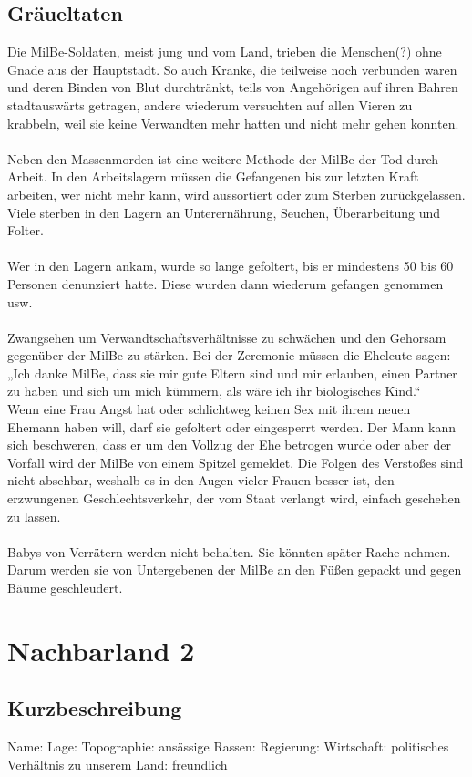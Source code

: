 \subsection{Gräueltaten}
Die MilBe-Soldaten, meist jung und vom Land, trieben die Menschen(?) ohne Gnade aus der Hauptstadt.
So auch Kranke, die teilweise noch verbunden waren und deren Binden von Blut durchtränkt, teils von Angehörigen auf ihren Bahren stadtauswärts getragen, andere wiederum versuchten auf allen Vieren zu krabbeln, weil sie keine Verwandten mehr hatten und nicht mehr gehen konnten.\\
\\
Neben den Massenmorden ist eine weitere Methode der MilBe der Tod durch Arbeit.
In den Arbeitslagern müssen die Gefangenen bis zur letzten Kraft arbeiten, wer nicht mehr kann, wird aussortiert oder zum Sterben zurückgelassen.
Viele sterben in den Lagern an Unterernährung, Seuchen, Überarbeitung und Folter.\\
\\
Wer in den Lagern ankam, wurde so lange gefoltert, bis er mindestens 50 bis 60 Personen denunziert hatte.
Diese wurden dann wiederum gefangen genommen usw.\\
\\
Zwangsehen um Verwandtschaftsverhältnisse zu schwächen und den Gehorsam gegenüber der MilBe zu stärken.
Bei der Zeremonie müssen die Eheleute sagen: „Ich danke MilBe, dass sie mir gute Eltern sind und mir erlauben, einen Partner zu haben und sich um mich kümmern, als wäre ich ihr biologisches Kind.“\\
Wenn eine Frau Angst hat oder schlichtweg keinen Sex mit ihrem neuen Ehemann haben will, darf sie gefoltert oder eingesperrt werden.
Der Mann kann sich beschweren, dass er um den Vollzug der Ehe betrogen wurde oder aber der Vorfall wird der MilBe von einem Spitzel gemeldet.
Die Folgen des Verstoßes sind nicht absehbar, weshalb es in den Augen vieler Frauen besser ist, den erzwungenen Geschlechtsverkehr, der vom Staat verlangt wird, einfach geschehen zu lassen.\\
\\
Babys von Verrätern werden nicht behalten.
Sie könnten später Rache nehmen.
Darum werden sie von Untergebenen der MilBe an den Füßen gepackt und gegen Bäume geschleudert.

\section{Nachbarland 2}
\subsection{Kurzbeschreibung}
\begin{outline}
	\1 Name: 
	\1 Lage:
	\1 Topographie:
	\1 ansässige Rassen:
	\1 Regierung:
	\1 Wirtschaft:
	\1 politisches Verhältnis zu unserem Land: freundlich
\end{outline}

